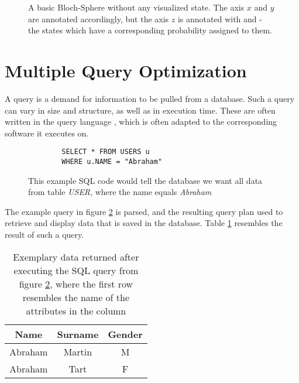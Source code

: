 \begin{figure}[!h]
    \centering
    \scalebox{0.75}{
        
    }
    \caption{A basic Bloch-Sphere without any visualized state. The axis $x$ and $y$ are annotated accordingly, but the axis $z$ is annotated with  and  - the states which have a corresponding probability assigned to them.}
    \label{figure:state_0_bloch_sphere}
\end{figure}


\newpage

\section{Multiple Query Optimization}

A query\cite{codd_relational_1970} is a demand for information to be pulled from a database. Such a query can vary in size and structure, as well as in execution time. These are often written in the query language , which is often adapted to the corresponding software\cite{shirgoldbird_microsoft_nodate}\cite{the_postgresql_global_development_group_postgresql_2022} it executes on. 

    
\begin{figure}[!h]
    \centering
    \begin{verbatim}
        SELECT * FROM USERS u
        WHERE u.NAME = "Abraham"
    \end{verbatim}
    \caption{This example SQL code would tell the database we want all data from table \emph{USER}, where the name equals \emph{Abraham}}
    \label{figure:sql_query_example}
\end{figure}

The example query in figure \ref{figure:sql_query_example} is parsed, and the resulting query plan used to retrieve and display data that is saved in the database. Table \ref{table:sql_query_result_example} resembles the result of such a query.

\begin{table}[!h]
    \centering
    \begin{tabular}{|c|c|c|}
        \hline
        Name    & Surname & Gender \\ \hline
        Abraham & Martin  & M      \\ \hline
        Abraham & Tart    & F      \\ \hline
    \end{tabular}
    \caption{Exemplary data returned after executing the SQL query from figure \ref{figure:sql_query_example}, where the first row resembles the name of the attributes in the column}
    \label{table:sql_query_result_example}
\end{table}

